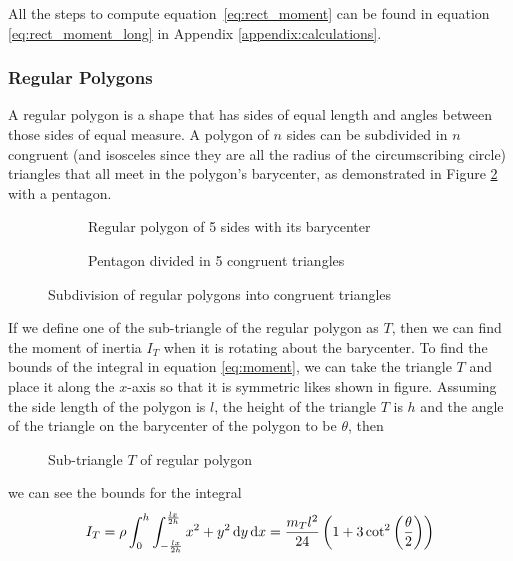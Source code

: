 All the steps to compute equation~\ref{eq:rect_moment} can be found in equation
\ref{eq:rect_moment_long} in Appendix \ref{appendix:calculations}.

\subsubsection{Regular Polygons}
\label{sub:regular_polygons}
A regular polygon is a shape that has sides of equal length and angles between
those sides of equal measure. A polygon of $n$ sides can be subdivided in $n$
congruent (and isosceles since they are all the radius of the circumscribing
circle) triangles that all meet in the polygon's barycenter,
as demonstrated in Figure \ref{fig:pentagon_triangles} with a pentagon.

\begin{figure}[H]
	\centering
	\hfill
	\begin{subfigure}[]{.45\textwidth}
		\centering
		\caption{Regular polygon of 5 sides with its barycenter}
		\label{fig:pentagon}
	\end{subfigure}
	\hfill
	\begin{subfigure}[]{.45\textwidth}
		\centering
		\caption{Pentagon divided in 5 congruent triangles}
		\label{fig:pentagon_triangles}
	\end{subfigure}
	\hfill\null
	\caption{Subdivision of regular polygons into congruent triangles}
	\label{fig:regular_poly}
\end{figure}

If we define one of the sub-triangle of the regular polygon as $T$, then we can
find the moment of inertia $I_T$ when it is rotating about the barycenter. To
find the bounds of the integral in equation \ref{eq:moment}, we can take the
triangle $T$ and place it along the $x$-axis so that it is symmetric likes shown
in figure. Assuming the side length of the polygon is $l$, the height of the
triangle $T$ is $h$ and the angle of the triangle on the barycenter of the
polygon to be $\theta$, then
\begin{figure}[H]
	\centering
	\caption{Sub-triangle $T$ of regular polygon}
	\label{fig:subtriangle}
\end{figure}
we can see the bounds for the integral
\begin{equation}
	\label{eq:subtriangle_moment}
	I_{T} = \rho \int_0^h\int_{-\frac{lx}{2h}}^{\frac{lx}{2h}}x^2 + y^2 \mathop{}\!\mathrm{d}
	y\mathop{}\!\mathrm{d} x= \frac{m_Tl^2}{24} \left(1 + 3\cot^2\left(\frac{\theta}{2}\right)\right)
\end{equation}

